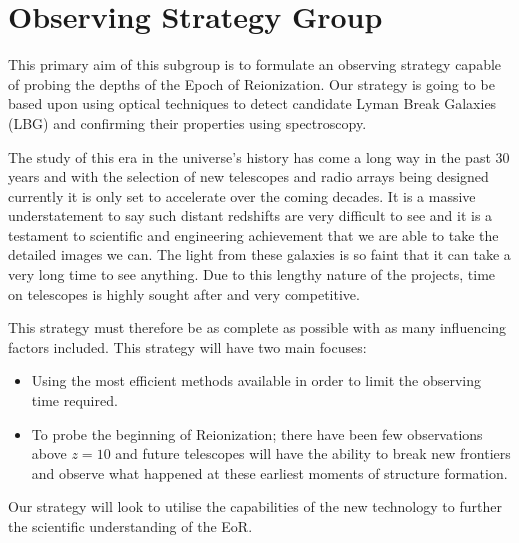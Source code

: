 \section{Observing Strategy Group} %
\label{sec:observing_strategy_group}
	This primary aim of this subgroup is to formulate an observing strategy capable of probing the depths of the Epoch of Reionization. Our strategy is going to be based upon using optical techniques to detect candidate Lyman Break Galaxies (LBG) and confirming their properties using spectroscopy.

	The study of this era in the universe’s history has come a long way in the past 30 years and with the selection of new telescopes and radio arrays being designed currently it is only set to accelerate over the coming decades. It is a massive understatement to say such distant redshifts are very difficult to see and it is a testament to scientific and engineering achievement that we are able to take the detailed images we can. The light from these galaxies is so faint that it can take a very long time to see anything. Due to this lengthy nature of the projects, time on telescopes is highly sought after and very competitive.

	This strategy must therefore be as complete as possible with as many influencing factors included. This strategy will have two main focuses:
	\begin{itemize}
		\item Using the most efficient methods available in order to limit the observing time required.
		\item To probe the beginning of Reionization; there have been few observations above $z=10$ and future telescopes will have the ability to break new frontiers and observe what happened at these earliest moments of structure formation.
	\end{itemize}

	Our strategy will look to utilise the capabilities of the new technology to further the scientific understanding of the EoR.

